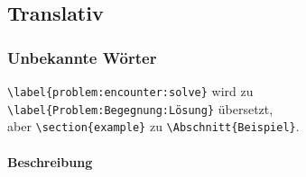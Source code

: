 
\subsection{Translativ}\label{problems:simple}
\subsubsection{Unbekannte Wörter}\label{problems:dim0}
\verb|\label{problem:encounter:solve}| wird zu \verb|\label{Problem:Begegnung:Lösung}| übersetzt,\\aber \verb|\section{example}| zu \verb|\Abschnitt{Beispiel}|.
\paragraph*{Beschreibung}
